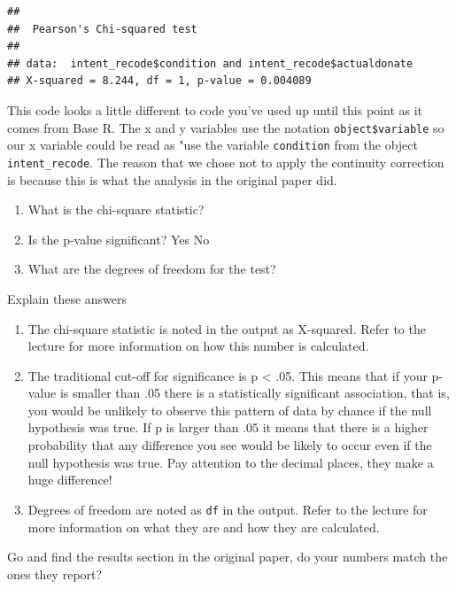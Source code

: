 \documentclass[]{book}
\providecommand{\tightlist}{%
  \setlength{\itemsep}{0pt}\setlength{\parskip}{0pt}}
\begin{document}
\begin{verbatim}
## 
##  Pearson's Chi-squared test
## 
## data:  intent_recode$condition and intent_recode$actualdonate
## X-squared = 8.244, df = 1, p-value = 0.004089
\end{verbatim}

This code looks a little different to code you've used up until this point as it comes from Base R. The x and y variables use the notation \texttt{object\$variable} so our x variable could be read as "use the variable \texttt{condition} from the object \texttt{intent\_recode}. The reason that we chose not to apply the continuity correction is because this is what the analysis in the original paper did.

\begin{enumerate}
\def\labelenumi{\arabic{enumi}.}
\tightlist
\item
  What is the chi-square statistic? 
\item
  Is the p-value significant? Yes No\\
\item
  What are the degrees of freedom for the test? 
\end{enumerate}

Explain these answers

\begin{enumerate}
\def\labelenumi{\arabic{enumi}.}
\tightlist
\item
  The chi-square statistic is noted in the output as X-squared. Refer to the lecture for more information on how this number is calculated.\\
\item
  The traditional cut-off for significance is p \textless{} .05. This means that if your p-value is smaller than .05 there is a statistically significant association, that is, you would be unlikely to observe this pattern of data by chance if the null hypothesis was true. If p is larger than .05 it means that there is a higher probability that any difference you see would be likely to occur even if the null hypothesis was true. Pay attention to the decimal places, they make a huge difference!\\
\item
  Degrees of freedom are noted as \texttt{df} in the output. Refer to the lecture for more information on what they are and how they are calculated.
\end{enumerate}

Go and find the results section in the original paper, do your numbers match the ones they report?
\end{document}
